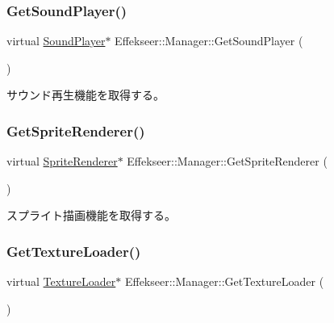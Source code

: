 \subsubsection{\texorpdfstring{Get\+Sound\+Player()}{GetSoundPlayer()}}
{\footnotesize\ttfamily virtual \mbox{\hyperlink{class_effekseer_1_1_sound_player}{Sound\+Player}}$\ast$ Effekseer\+::\+Manager\+::\+Get\+Sound\+Player (\begin{DoxyParamCaption}{ }\end{DoxyParamCaption})\hspace{0.3cm}{\ttfamily [pure virtual]}}



サウンド再生機能を取得する。 

\mbox{\label{class_effekseer_1_1_manager_a64de7501affd3c08106b0442a4e2a76c}} 
\subsubsection{\texorpdfstring{Get\+Sprite\+Renderer()}{GetSpriteRenderer()}}
{\footnotesize\ttfamily virtual \mbox{\hyperlink{class_effekseer_1_1_sprite_renderer}{Sprite\+Renderer}}$\ast$ Effekseer\+::\+Manager\+::\+Get\+Sprite\+Renderer (\begin{DoxyParamCaption}{ }\end{DoxyParamCaption})\hspace{0.3cm}{\ttfamily [pure virtual]}}



スプライト描画機能を取得する。 

\mbox{\label{class_effekseer_1_1_manager_ae143d53bb483cb38d6371eff52d1a833}} 
\subsubsection{\texorpdfstring{Get\+Texture\+Loader()}{GetTextureLoader()}}
{\footnotesize\ttfamily virtual \mbox{\hyperlink{class_effekseer_1_1_texture_loader}{Texture\+Loader}}$\ast$ Effekseer\+::\+Manager\+::\+Get\+Texture\+Loader (\begin{DoxyParamCaption}{ }\end{DoxyParamCaption})\hspace{0.3cm}{\ttfamily [pure virtual]}}



